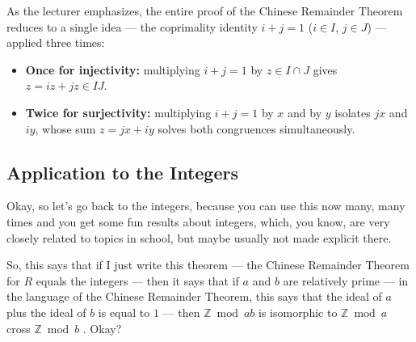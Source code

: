 \begin{insight}
As the lecturer emphasizes, the entire proof of the Chinese Remainder Theorem reduces to a single idea --- the coprimality identity $i + j = 1$ ($i \in I$, $j \in J$) --- applied three times:
\begin{itemize}
    \item \textbf{Once for injectivity:} multiplying $i + j = 1$ by $z \in I \cap J$ gives $z = iz + jz \in IJ$.
    \item \textbf{Twice for surjectivity:} multiplying $i + j = 1$ by $x$ and by $y$ isolates $jx$ and $iy$, whose sum $z = jx + iy$ solves both congruences simultaneously.
\end{itemize}
\end{insight}

\subsection{Application to the Integers}

\begin{speech}[00:13:59 - 00:15:00]
Okay, so let's go back to the integers, because you can use this now many, many times and you get some fun results about integers, which, you know, are very closely related to topics in school, but maybe usually not made explicit there.

So, this says that if I just write this theorem --- the Chinese Remainder Theorem for $R$ equals the integers  --- then it says that if $a$ and $b$ are relatively prime  --- in the language of the Chinese Remainder Theorem, this says that the ideal of $a$ plus the ideal of $b$ is equal to $1$  --- then $\mathbb{Z} \bmod ab$ is isomorphic to $\mathbb{Z} \bmod a$ cross $\mathbb{Z} \bmod b$ . Okay?
\end{speech}

